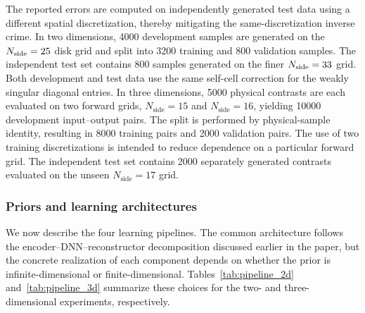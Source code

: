 \documentclass{article}
\numberwithin{equation}{section}
\theoremstyle{plain}
\begin{document}
The reported errors are computed on independently generated test data using a different spatial discretization, thereby mitigating the same-discretization inverse crime.  In two dimensions, 4000 development samples are generated on the $N_{\rm side}=25$ disk grid and split into 3200 training and 800 validation samples. The independent test set contains 800 samples generated on the finer $N_{\rm side}=33$ grid. Both development and test data use the same self-cell correction for the weakly singular diagonal entries.  In three dimensions, 5000 physical contrasts are each evaluated on two forward grids, $N_{\mathrm{side}}=15$ and $N_{\mathrm{side}}=16$, yielding 10000 development input--output pairs. The split is performed by physical-sample identity, resulting in 8000 training pairs and 2000 validation pairs. The use of two training discretizations is intended to reduce dependence on a particular forward grid. The independent test set contains 2000 separately generated contrasts evaluated on the unseen $N_{\mathrm{side}}=17$ grid.

\subsubsection{Priors and learning architectures}

We now describe the four learning pipelines.  The common architecture follows the encoder--DNN--reconstructor decomposition discussed earlier in the paper, but the concrete realization of each component depends on whether the prior is infinite-dimensional or finite-dimensional.  Tables~\ref{tab:pipeline_2d} and~\ref{tab:pipeline_3d} summarize these choices for the two- and three-dimensional experiments, respectively.
\end{document}

